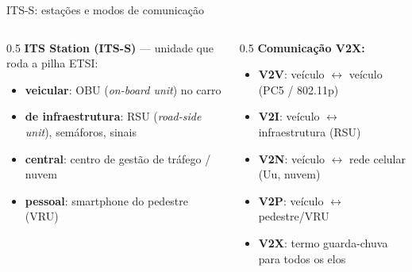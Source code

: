\documentclass[aspectratio=169,11pt]{beamer}
\begin{document}
\begin{frame}{ITS-S: estações e modos de comunicação}
  \begin{columns}
    \begin{column}{0.5\textwidth}
      \textbf{ITS Station (ITS-S)} --- unidade que roda a pilha ETSI:
      \begin{itemize}
        \item \textbf{veicular}: OBU (\emph{on-board unit}) no carro
        \item \textbf{de infraestrutura}: RSU (\emph{road-side unit}), semáforos, sinais
        \item \textbf{central}: centro de gestão de tráfego / nuvem
        \item \textbf{pessoal}: smartphone do pedestre (VRU)
      \end{itemize}
    \end{column}
    \begin{column}{0.5\textwidth}
      \textbf{Comunicação V2X:}
      \begin{itemize}
        \item \textbf{V2V}: veículo $\leftrightarrow$ veículo (PC5 / 802.11p)
        \item \textbf{V2I}: veículo $\leftrightarrow$ infraestrutura (RSU)
        \item \textbf{V2N}: veículo $\leftrightarrow$ rede celular (Uu, nuvem)
        \item \textbf{V2P}: veículo $\leftrightarrow$ pedestre/VRU
        \item \textbf{V2X}: termo guarda-chuva para todos os elos
      \end{itemize}
    \end{column}
  \end{columns}
  \begin{center}
  \end{center}
\end{frame}
\end{document}
